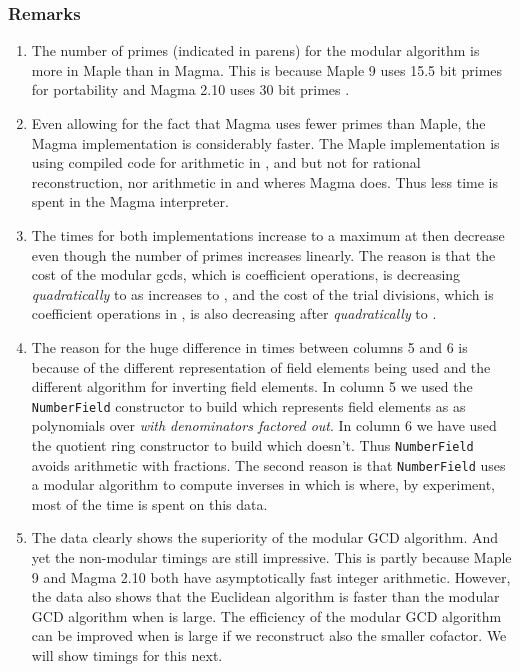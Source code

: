\documentclass[10pt]{article}
\begin{document}
\subsubsection*{Remarks}
\begin{enumerate}
\item The number of primes (indicated in parens) for
  the modular algorithm is more in Maple than in Magma.
  This is because Maple 9 uses 15.5 bit primes for portability \cite{Disco}
  and Magma 2.10 uses 30 bit primes \cite{Steel}.

\item Even allowing for the fact that Magma uses fewer primes than
  Maple, the Magma implementation is considerably faster.
  The Maple implementation is using compiled code for arithmetic
  in ,  and  but not for rational reconstruction,
  nor arithmetic in  and 
  wheres Magma does.  Thus less time is spent in the Magma interpreter.

\item The times for both implementations increase to a
  maximum at  then decrease even though the number of primes
  increases linearly.  The reason is that the cost of the modular gcds,
  which is  coefficient operations,
  is decreasing {\em quadratically} to  as  increases to ,
  and the cost of the trial divisions, which is 
  coefficient operations in , is also decreasing after 
  {\em quadratically} to .

\item The reason for the huge difference in times between columns
  5 and 6 is because of the different representation of field elements
  being used and the different algorithm for inverting field elements.
  In column 5 we used the {\tt NumberField} constructor to build 
  which represents field elements as as polynomials over 
  {\em with denominators factored out}.  In column 6 we have used
  the quotient ring constructor to build  which doesn't.
  Thus {\tt NumberField} avoids arithmetic with fractions.
  The second reason is that {\tt NumberField} uses a modular
  algorithm to compute inverses in  which is where, by experiment,
  most of the time is spent on this data.

\item The data clearly shows the superiority of the modular GCD algorithm.
  And yet the non-modular timings are still impressive.  This is partly because
  Maple 9 and Magma 2.10 both have asymptotically fast integer arithmetic.
However, the data also shows that the Euclidean algorithm is faster
  than the modular GCD algorithm when  is large.
  The efficiency of the modular GCD algorithm can be improved when  is large
  if we reconstruct also  the smaller cofactor.
  We will show timings for this next.
\end{enumerate}
\end{document}
